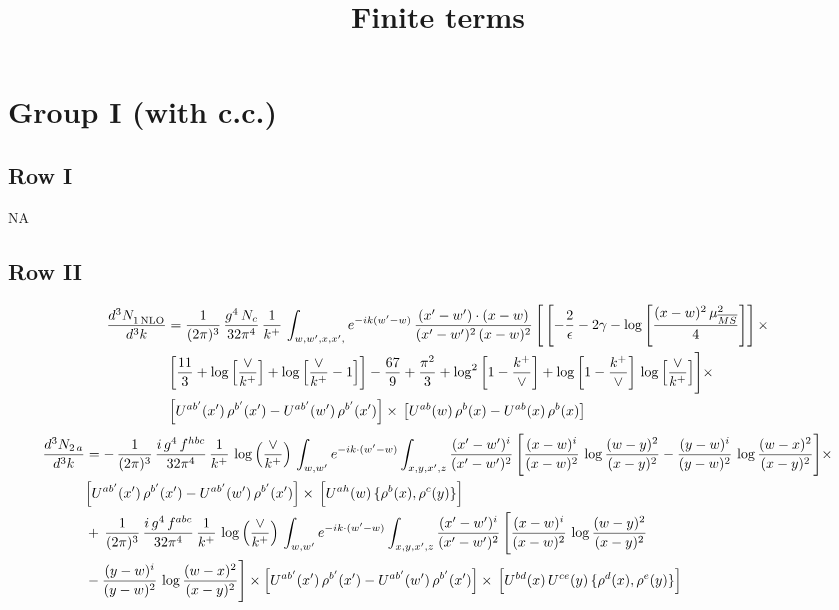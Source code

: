 \documentclass[9pt]{article}
\title{Finite terms}
\author{}
\date{}
\numberwithin{equation}{section}
\begin{document}
\maketitle
\section{Group I (with c.c.)}
\subsection{Row I}
\textsc{NA}
\subsection{Row II}
\begin{align}
     \frac{d^{3}N_{1\,\rm NLO}^{\rm}}{d^{3}k} &  = \frac{1}{(2\pi)^{3}}\, \frac{g^{4}\,N_{c}}{32\pi^{4}}\,\frac{1}{k^{+}}\, \int_{w, w',x,x',} e^{-ik(w^\prime-w)}\, \frac{(x'-w')\cdot (x-w)}{(x'-w')^{2}\, (x-w)^{2}}\, \Bigg[\left[-\frac{2}{\epsilon}-2\gamma-\log{\left[\frac{(x-w)^{2}\,\mu^{2}_{\overline{MS}}}{4}\right]}\right]\times \notag \\ & \left[\frac{11}{3}+\log{\left[\frac{\vee}{k^{+}}\right]}+\log{\left[\frac{\vee}{k^{+}}-1\right]}\right]-\frac{67}{9}+\frac{\pi^{2}}{3}+\log^{2}{\left[1-\frac{k^{+}}{\vee}\right]}+\log{\left[1-\frac{k^{+}}{\vee}\right]}\,\log{\left[\frac{\vee}{k^{+}}\right]}\Bigg]\times\notag \\ & \left[U^{ab'}(x')\,\rho^{b'}(x') - U^{ab'}(w')\,\rho^{b'}(x')\right]\times\,\left[U^{ab}(w)\,\rho^{b}(x) - U^{ab}(x)\,\rho^{b}(x)\right]
\end{align}
\begin{align}
    \frac{d^{3}N_{2\,a}}{d^{3}k} & =  -\,\frac{1}{(2\pi)^{3}}\,\frac{i\,g^{4}\,f^{hbc}}{32\pi^{4}}\,\frac{1}{k^{+}}\,\log\left(\frac{\vee}{k^{+}}\right)\,
\int_{w,w'} e^{-ik\cdot(w'-w)}\int_{x,y,x',z}\frac{(x'-w')^{i}}{(x'-w')^{2}}\,\Bigg[\frac{(x-w)^{i}}{(x-w)^{2}}\,\log\frac{(w-y)^{2}}{(x-y)^{2}}-\frac{(y-w)^{i}}{(y-w)^{2}}\,\log\frac{(w-x)^{2}}{(x-y)^{2}}\Bigg]\times\notag \\ & \Big[U^{ab'}(x')\,\rho^{b'}(x')-U^{ab'}(w')\,\rho^{b'}(x')\Big]\times\, \Big[U^{ah}(w)\,\{\rho^{b}(x),\rho^{c}(y)\}\Big]\notag \\ & +\,\frac{1}{(2\pi)^{3}}\,\frac{i\,g^{4}\,f^{abc}}{32\pi^{4}}\,\frac{1}{k^{+}}\, \log\left(\frac{\vee}{k^{+}}\right)\,
\int_{w,w'} e^{-ik\cdot(w'-w)}\int_{x,y,x',z}\frac{(x'-w')^{i}}{(x'-w')^{2}}\,\Bigg[\frac{(x-w)^{i}}{(x-w)^{2}}\,\log\frac{(w-y)^{2}}{(x-y)^{2}}\notag \\ & -\frac{(y-w)^{i}}{(y-w)^{2}}\,\log\frac{(w-x)^{2}}{(x-y)^{2}}\Bigg]\times \Big[U^{ab'}(x')\,\rho^{b'}(x')-U^{ab'}(w')\,\rho^{b'}(x')\Big]\times\, \Big[U^{bd}(x)\,U^{ce}(y)\,\{\rho^{d}(x),\rho^{e}(y)\}\Big]
\end{align}
\end{document}
